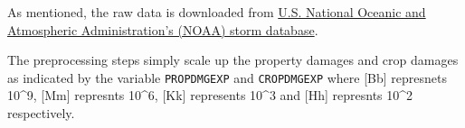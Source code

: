 \documentclass[]{article}
\newenvironment{Shaded}{\begin{snugshade}}{\end{snugshade}}
\newcommand{\KeywordTok}[1]{\textcolor[rgb]{0.13,0.29,0.53}{\textbf{#1}}}
\newcommand{\DataTypeTok}[1]{\textcolor[rgb]{0.13,0.29,0.53}{#1}}
\newcommand{\StringTok}[1]{\textcolor[rgb]{0.31,0.60,0.02}{#1}}
\newcommand{\ControlFlowTok}[1]{\textcolor[rgb]{0.13,0.29,0.53}{\textbf{#1}}}
\newcommand{\OperatorTok}[1]{\textcolor[rgb]{0.81,0.36,0.00}{\textbf{#1}}}
\newcommand{\NormalTok}[1]{#1}
\begin{document}
As mentioned, the raw data is downloaded from
\href{https://d396qusza40orc.cloudfront.net/repdata\%2Fdata\%2FStormData.csv.bz2}{U.S.
National Oceanic and Atmospheric Administration's (NOAA) storm
database}.

\begin{Shaded}
\end{Shaded}

The preprocessing steps simply scale up the property damages and crop
damages as indicated by the variable \texttt{PROPDMGEXP} and
\texttt{CROPDMGEXP} where {[}Bb{]} represnets 10\^{}9, {[}Mm{]}
represnts 10\^{}6, {[}Kk{]} represents 10\^{}3 and {[}Hh{]} represnts
10\^{}2 respectively.
\end{document}
